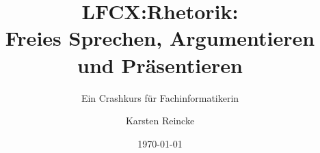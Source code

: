 \documentclass[]{beamer}
\title{LFCX:Rhetorik:\\Freies Sprechen, Argumentieren und Präsentieren}
\subtitle{Ein Crashkurs für Fachinformatikerin}
\institute[GS-LDK]{Gewerbliche Schulen Dillenburg}
\author{Karsten Reincke}
\date{\today}
\def\cfgGl{../../../cfg.gl/}
\begin{document}

\begin{frame}
  \titlepage

  
\end{frame}






\logo{}
\newpage



%
\end{document}
